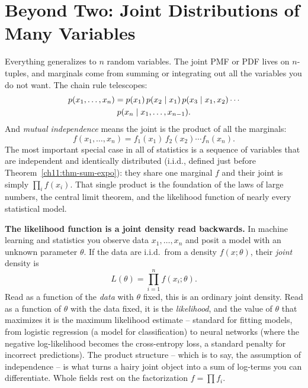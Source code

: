 \section{Beyond Two: Joint Distributions of Many Variables}
\label{ch13:many}

Everything generalizes to $n$ random variables. The joint PMF or PDF lives on
$n$-tuples, and marginals come from summing or integrating out all the variables
you do not want. The chain rule telescopes:
\begin{multline*}
  p(x_1,\dots,x_n) = p(x_1)\,p(x_2\mid x_1)\,p(x_3\mid x_1,x_2)\cdots \\
                     p(x_n\mid x_1,\dots,x_{n-1}).
\end{multline*}
And \emph{mutual independence} means the joint is the product of all the
marginals:
\[
  f(x_1,\dots,x_n) = f_1(x_1)\,f_2(x_2)\cdots f_n(x_n).
\]
The most important special case in all of statistics is a sequence of variables
that are independent and identically distributed (i.i.d., defined just before Theorem~\ref{ch11:thm-sum-expo}): they share one
marginal $f$ and their joint is simply $\prod_i f(x_i)$. That single product is
the foundation of the laws of large numbers, the central limit theorem, and the
likelihood function of nearly every statistical model.

\begin{applicationbox}
\textbf{The likelihood function is a joint density read backwards.} In machine
learning and statistics you observe data $x_1,\dots,x_n$ and posit a model with
an unknown parameter $\theta$. If the data are i.i.d.\ from a density
$f(x;\theta)$, their \emph{joint} density is
\[
  L(\theta) = \prod_{i=1}^{n} f(x_i;\theta).
\]
Read as a function of the \emph{data} with $\theta$ fixed, this is an ordinary
joint density. Read as a function of $\theta$ with the data fixed, it is the
\emph{likelihood}, and the value of $\theta$ that maximizes it is the maximum
likelihood estimate -- standard for fitting models, from logistic regression (a model for classification)
to neural networks (where the negative log-likelihood becomes the cross-entropy loss, a standard penalty for incorrect predictions). The
product structure -- which is to say, the assumption of independence -- is what
turns a hairy joint object into a sum of log-terms you can differentiate. Whole
fields rest on the factorization $f=\prod f_i$.
\end{applicationbox}


